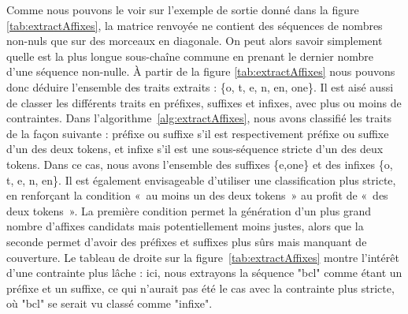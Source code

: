 \documentclass[12pt,a4paper,times,twoside,openright]{report}
\begin{document}
Comme nous pouvons le voir sur l'exemple de sortie donné dans la figure \ref{tab:extractAffixes}, la matrice renvoyée ne contient des séquences de nombres non-nuls que sur des morceaux en diagonale. On peut alors savoir simplement quelle est la plus longue sous-chaîne commune en prenant le dernier nombre d'une séquence non-nulle. À partir de la figure \ref{tab:extractAffixes} nous pouvons donc déduire l'ensemble des traits extraits : \{o, t, e, n, en, one\}. Il est aisé aussi de classer les différents traits en préfixes, suffixes et infixes, avec plus ou moins de contraintes. Dans l'algorithme\ \ref{alg:extractAffixes}, nous avons classifié les traits de la façon suivante : préfixe ou suffixe s'il est respectivement préfixe ou suffixe d'un des deux tokens, et infixe s'il est une sous-séquence stricte d'un des deux tokens. Dans ce cas, nous avons l'ensemble des suffixes \{e,one\} et des infixes \{o, t, e, n, en\}. Il est également envisageable d'utiliser une classification plus stricte, en renforçant la condition «\ au moins un des deux tokens\ » au profit de «\ des deux tokens\ ». La première condition permet la génération d'un plus grand nombre d'affixes candidats mais potentiellement moins justes, alors que la seconde permet d'avoir des préfixes et suffixes plus sûrs mais manquant de couverture. Le tableau de droite sur la figure\ \ref{tab:extractAffixes} montre l'intérêt d'une contrainte plus lâche : ici, nous extrayons la séquence "bcl" comme étant un préfixe et un suffixe, ce qui n'aurait pas été le cas avec la contrainte plus stricte, où "bcl" se serait vu classé comme "infixe".
\end{document}
